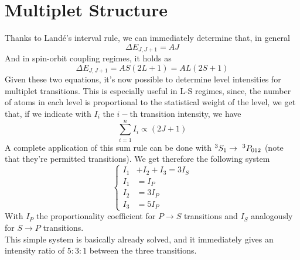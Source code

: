 \documentclass[../qm.tex]{subfiles}
\begin{document}
	\section{Multiplet Structure}
	Thanks to Landé's interval rule, we can immediately determine that, in general
	\begin{equation*}
		\Delta E_{J,J+1}=AJ
	\end{equation*}
	And in spin-orbit coupling regimes, it holds as
	\begin{equation*}
		\Delta E_{J,J+1}=AS(2L+1)=AL(2S+1)
	\end{equation*}
	Given these two equations, it's now possible to determine level intensities for multiplet transitions. This is especially useful in L-S regimes, since, the number of atoms in each level is proportional to the statistical weight of the level, we get that, if we indicate with $I_i$ the $i-$th transition intensity, we have
	\begin{equation}
		\sum_{i=1}^nI_i\propto(2J+1)
		\label{eq:intensitysumrule}
	\end{equation}
	A complete application of this sum rule can be done with $\term[1]{S}{3}\to\ \term[012]{P}{3}$ (note that they're permitted transitions). We get therefore the following system
	\begin{equation}
		\left\{
			\begin{aligned}
				I_1&+I_2+I_3=3I_S\\
				I_1&=I_P\\
				I_2&=3I_P\\
				I_3&=5I_P
			\end{aligned}
		\right.
		\label{eq:simplesystem}
	\end{equation}
	With $I_P$ the proportionality coefficient for $P\to S$ transitions and $I_S$ analogously for $S\to P$ transitions.\\
	This simple system is basically already solved, and it immediately gives an intensity ratio of $5:3:1$ between the three transitions.\\
\end{document}
